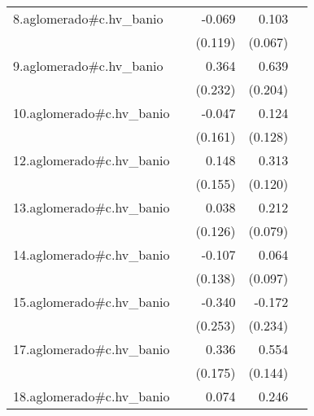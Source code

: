 {\begin{longtable}{l*{4}{D{.}{.}{-1}}}
\addlinespace
8.aglomerado#c.hv\_banio&                     &      -0.069         &       0.103         &                     \\
            &                     &     (0.119)         &     (0.067)         &                     \\
\addlinespace
9.aglomerado#c.hv\_banio&                     &       0.364         &       0.639\sym{**} &                     \\
            &                     &     (0.232)         &     (0.204)         &                     \\
\addlinespace
10.aglomerado#c.hv\_banio&                     &      -0.047         &       0.124         &                     \\
            &                     &     (0.161)         &     (0.128)         &                     \\
\addlinespace
12.aglomerado#c.hv\_banio&                     &       0.148         &       0.313\sym{**} &                     \\
            &                     &     (0.155)         &     (0.120)         &                     \\
\addlinespace
13.aglomerado#c.hv\_banio&                     &       0.038         &       0.212\sym{**} &                     \\
            &                     &     (0.126)         &     (0.079)         &                     \\
\addlinespace
14.aglomerado#c.hv\_banio&                     &      -0.107         &       0.064         &                     \\
            &                     &     (0.138)         &     (0.097)         &                     \\
\addlinespace
15.aglomerado#c.hv\_banio&                     &      -0.340         &      -0.172         &                     \\
            &                     &     (0.253)         &     (0.234)         &                     \\
\addlinespace
17.aglomerado#c.hv\_banio&                     &       0.336         &       0.554\sym{***}&                     \\
            &                     &     (0.175)         &     (0.144)         &                     \\
\addlinespace
18.aglomerado#c.hv\_banio&                     &       0.074         &       0.246\sym{***}&                     \\

\end{longtable}}
